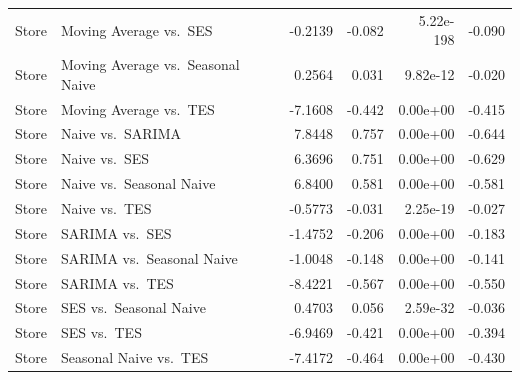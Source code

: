 {\begin{tabular}{llrrrr}
Store & Moving Average vs.~SES & -0.2139 & -0.082 & 5.22e-198 & -0.090 \\
Store & Moving Average vs.~Seasonal Naive & 0.2564 & 0.031 & 9.82e-12 & -0.020 \\
Store & Moving Average vs.~TES & -7.1608 & -0.442 & 0.00e+00 & -0.415 \\
Store & Naive vs.~SARIMA & 7.8448 & 0.757 & 0.00e+00 & -0.644 \\
Store & Naive vs.~SES & 6.3696 & 0.751 & 0.00e+00 & -0.629 \\
Store & Naive vs.~Seasonal Naive & 6.8400 & 0.581 & 0.00e+00 & -0.581 \\
Store & Naive vs.~TES & -0.5773 & -0.031 & 2.25e-19 & -0.027 \\
Store & SARIMA vs.~SES & -1.4752 & -0.206 & 0.00e+00 & -0.183 \\
Store & SARIMA vs.~Seasonal Naive & -1.0048 & -0.148 & 0.00e+00 & -0.141 \\
Store & SARIMA vs.~TES & -8.4221 & -0.567 & 0.00e+00 & -0.550 \\
Store & SES vs.~Seasonal Naive & 0.4703 & 0.056 & 2.59e-32 & -0.036 \\
Store & SES vs.~TES & -6.9469 & -0.421 & 0.00e+00 & -0.394 \\
Store & Seasonal Naive vs.~TES & -7.4172 & -0.464 & 0.00e+00 & -0.430 \\
\bottomrule
\end{tabular}}
